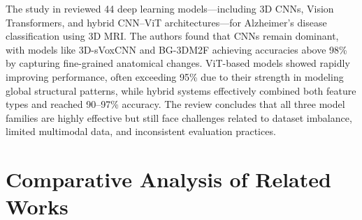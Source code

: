 The study in \cite{bravo2024systematic} reviewed 44 deep learning models—including 3D CNNs, Vision Transformers, and hybrid CNN–ViT architectures—for Alzheimer’s disease classification using 3D MRI. The authors found that CNNs remain dominant, with models like 3D-sVoxCNN and BG-3DM2F achieving accuracies above 98\% by capturing fine-grained anatomical changes. ViT-based models showed rapidly improving performance, often exceeding 95\% due to their strength in modeling global structural patterns, while hybrid systems effectively combined both feature types and reached 90–97\% accuracy. The review concludes that all three model families are highly effective but still face challenges related to dataset imbalance, limited multimodal data, and inconsistent evaluation practices.


\newpage
\section{Comparative Analysis of Related Works}
